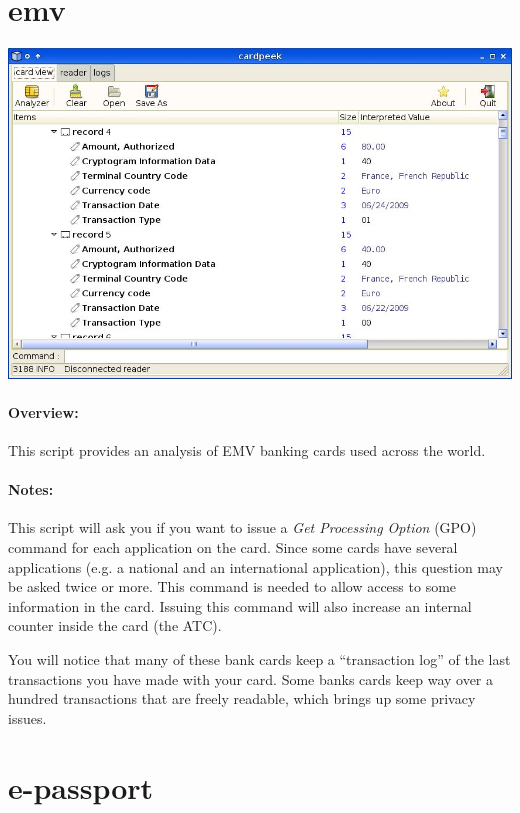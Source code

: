 \documentclass[11pt]{report}
\begin{document}
\section{emv}

\begin{center}
\includegraphics[width=1\textwidth]{graphics/sample-emv.jpg}
\end{center}

\paragraph{Overview:}
This script provides an analysis of EMV banking cards used across the world.

\paragraph{Notes:}
This script will ask you if you want to issue a \emph{Get Processing Option} (GPO) command for each application on the card.
Since some cards have several applications (e.g. a national and an international application), this question may be asked twice or more.
This command is needed to allow access to some information in the card.
Issuing this command will also increase an internal counter inside the card (the ATC). 

You will notice that many of these bank cards keep a ``transaction log'' of the last transactions you have made with your card.
Some banks cards keep way over a hundred transactions that are freely readable, which brings up some privacy issues.

\section{e-passport}
\end{document}
